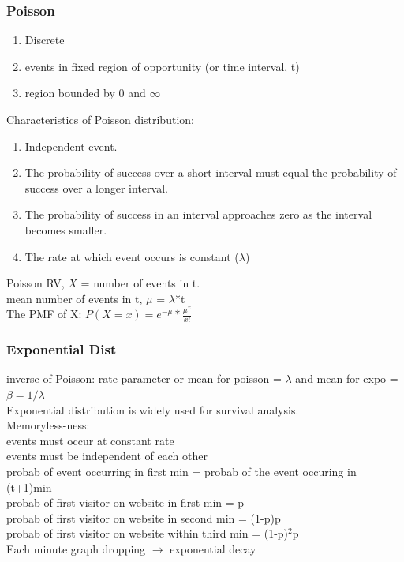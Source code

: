 \documentclass{beamer}
\begin{document}
\begin{frame}\frametitle{Poisson}
	\begin{enumerate}
		\item Discrete
		\item events in fixed region of opportunity (or time interval, t)
		\item region bounded by 0 and $\infty$
	\end{enumerate}
	Characteristics of Poisson distribution:
	\begin{enumerate}
		\item Independent event.
		\item The probability of success over a short interval must equal the probability of success over a longer interval.
		\item The probability of success in an interval approaches zero as the interval becomes smaller.
		\item The rate at which event occurs is constant ($\lambda$)
	\end{enumerate}	

	Poisson RV, $X$ = number of events in t.\\
	mean number of events in t, $\mu$ = $\lambda$*t\\
	The PMF of X: 	$P(X=x)=e^{-\mu}*\frac{\mu^x}{x!}$
\end{frame}


\begin{frame}\frametitle{Exponential Dist}
	inverse of Poisson: rate parameter or mean for poisson = $\lambda$ and mean for expo = $\beta=1/\lambda$ \\
	Exponential distribution is widely used for survival analysis.\\
	Memoryless-ness:\\
	events must occur at constant rate\\
	events must be independent of each other\\
	probab of event occurring in first min = probab of the event occuring in (t+1)min\\
	probab of first visitor on website in first min = p\\
	probab of first visitor on website in second min = (1-p)p\\
	probab of first visitor on website within third min = (1-p)$^2$p\\
	Each minute graph dropping $\rightarrow$ exponential decay
	

\end{frame}
\end{document}
